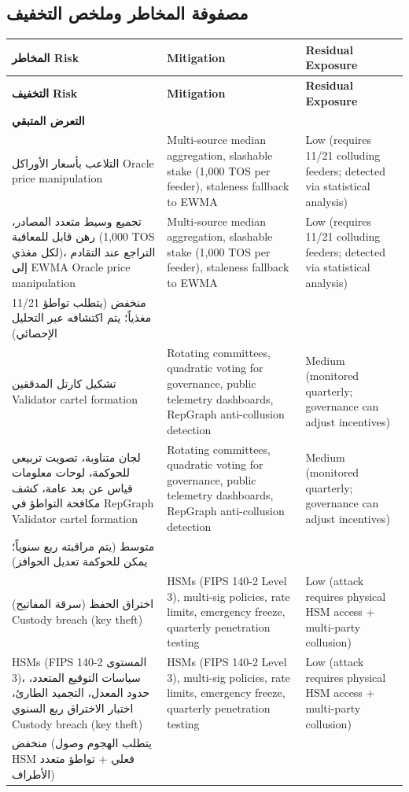 \documentclass[11pt]{article}
\begin{document}
\subsection{مصفوفة المخاطر وملخص التخفيف}
\begin{longtable}{@{}p{}p{}p{}@{}}
\toprule
\textbf{المخاطر} \textbf{Risk} & \textbf{Mitigation} & \textbf{Residual Exposure} \\\midrule \textbf{التخفيف} \textbf{Risk} & \textbf{Mitigation} & \textbf{Residual Exposure} \\\midrule \textbf{التعرض المتبقي} \\\midrule
التلاعب بأسعار الأوراكل Oracle price manipulation & Multi-source median aggregation, slashable stake (1,000 TOS per feeder), staleness fallback to EWMA & Low (requires 11/21 colluding feeders; detected via statistical analysis) \\ تجميع وسيط متعدد المصادر، رهن قابل للمعاقبة (1,000 TOS لكل مغذي)، التراجع عند التقادم إلى EWMA Oracle price manipulation & Multi-source median aggregation, slashable stake (1,000 TOS per feeder), staleness fallback to EWMA & Low (requires 11/21 colluding feeders; detected via statistical analysis) \\ منخفض (يتطلب تواطؤ 11/21 مغذياً؛ يتم اكتشافه عبر التحليل الإحصائي) \\
تشكيل كارتل المدققين Validator cartel formation & Rotating committees, quadratic voting for governance, public telemetry dashboards, RepGraph anti-collusion detection & Medium (monitored quarterly; governance can adjust incentives) \\ لجان متناوبة، تصويت تربيعي للحوكمة، لوحات معلومات قياس عن بعد عامة، كشف مكافحة التواطؤ في RepGraph Validator cartel formation & Rotating committees, quadratic voting for governance, public telemetry dashboards, RepGraph anti-collusion detection & Medium (monitored quarterly; governance can adjust incentives) \\ متوسط (يتم مراقبته ربع سنوياً؛ يمكن للحوكمة تعديل الحوافز) \\
اختراق الحفظ (سرقة المفاتيح) Custody breach (key theft) & HSMs (FIPS 140-2 Level 3), multi-sig policies, rate limits, emergency freeze, quarterly penetration testing & Low (attack requires physical HSM access + multi-party collusion) \\ HSMs (FIPS 140-2 المستوى 3)، سياسات التوقيع المتعدد، حدود المعدل، التجميد الطارئ، اختبار الاختراق ربع السنوي Custody breach (key theft) & HSMs (FIPS 140-2 Level 3), multi-sig policies, rate limits, emergency freeze, quarterly penetration testing & Low (attack requires physical HSM access + multi-party collusion) \\ منخفض (يتطلب الهجوم وصول HSM فعلي + تواطؤ متعدد الأطراف) \\

\end{longtable}
\end{document}
